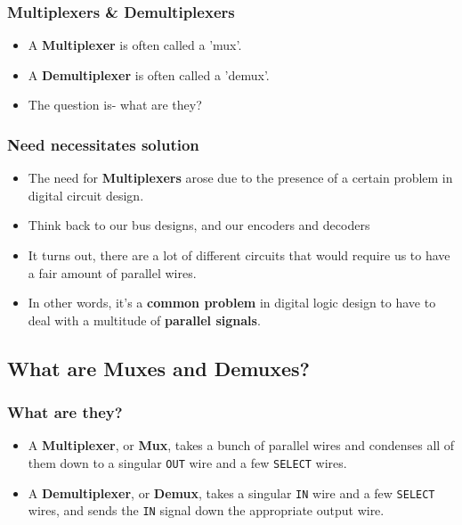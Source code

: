 \documentclass{beamer}
\begin{document}
		\begin{frame}
    		\frametitle{Multiplexers \& Demultiplexers}
    		
    		\begin{itemize}
    			\item A \textbf{Multiplexer} is often called a 'mux'.
    			\item A \textbf{Demultiplexer} is often called a 'demux'.
    			\item The question is- what are they?
    		\end{itemize}
    		
		\end{frame}
		
		\begin{frame}
			\frametitle{Need necessitates solution}
			\begin{itemize}
				\item The need for \textbf{Multiplexers} arose due to the presence of a certain problem in digital circuit design.
				\item Think back to our bus designs, and our encoders and decoders
				\item It turns out, there are a lot of different circuits that would require us to have a fair amount of parallel wires.
				\item In other words, it's a \textbf{common problem} in digital logic design to have to deal with a multitude of \textbf{parallel signals}.
				
			\end{itemize}
		\end{frame}		 
		
			  	        
        
    
    	\subsection{What are Muxes and Demuxes?}
    	
    	\begin{frame}
    		\frametitle{What are they?}
    		\begin{itemize}
    			\item A \textbf{Multiplexer}, or \textbf{Mux}, takes a bunch of parallel wires and condenses all of them down to a singular \texttt{OUT} wire and a few \texttt{SELECT} wires.
    			\item A \textbf{Demultiplexer}, or \textbf{Demux}, takes a singular \texttt{IN} wire and a few \texttt{SELECT} wires, and sends the \texttt{IN} signal down the appropriate output wire.
    		\end{itemize}
    	\end{frame}
    	
\end{document}
